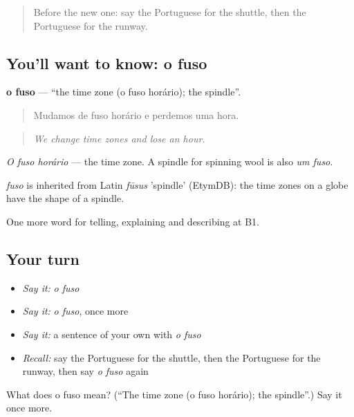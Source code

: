 \label{lesson:PT-C421-fuso}



\begin{quote}
Before the new one: say the Portuguese for the shuttle, then the Portuguese for the runway.
\end{quote}

\subsection*{You'll want to know: o fuso}
\textbf{o fuso} — \textquotedblleft{}the time zone (o fuso horário); the spindle\textquotedblright{}.

\begin{quote}
Mudamos de fuso horário e perdemos uma hora.
\end{quote}

\begin{quote}
\emph{We change time zones and lose an hour.}
\end{quote}

\emph{O fuso horário} — the time zone. A spindle for spinning wool is also \emph{um fuso}.

\begin{cousinweb}
\emph{fuso} is inherited from Latin \emph{fūsus} 'spindle' (EtymDB): the time zones on a globe have the shape of a spindle.
\end{cousinweb}

\begin{grammarlens}[title={What you've built}]
One more word for telling, explaining and describing at B1.
\end{grammarlens}

\subsection*{Your turn}
\begin{itemize}
\raggedright
  \item \emph{Say it:} \emph{o fuso}
  \item \emph{Say it:} \emph{o fuso}, once more
  \item \emph{Say it:} a sentence of your own with \emph{o fuso}
  \item \emph{Recall:} say the Portuguese for the shuttle, then the Portuguese for the runway, then say \emph{o fuso} again
\end{itemize}

\begin{tcolorbox}[breakable,colback=teal!4,colframe=teal!35!black,title={Before you move on}]
What does o fuso mean? (\textquotedblleft{}The time zone (o fuso horário); the spindle\textquotedblright{}.) Say it once more.
\end{tcolorbox}

